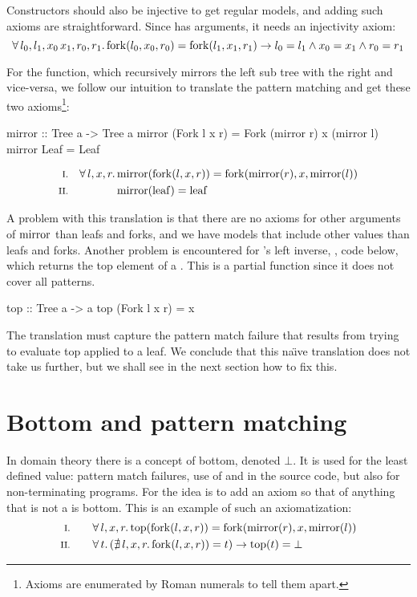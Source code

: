 Constructors should also be injective to get regular models, and
adding such axioms are straightforward. Since  has arguments,
it needs an injectivity axiom:
\begin{equation*}
\forall \, l_0 , l_1 , x_0 \, x_1 , r_0 , r_1 . \, \mathrm{fork}(l_0,x_0,r_0) =
\mathrm{fork}(l_1,x_1,r_1) \rightarrow l_0 = l_1 \wedge x_0 = x_1 \wedge r_0 = r_1
\end{equation*}

For the  function, which recursively mirrors the left sub
tree with the right and vice-versa, we follow our intuition to
translate the pattern matching and get these two axioms\footnote
{Axioms are enumerated by Roman numerals to tell them apart.}:

\begin{code}
mirror :: Tree a -> Tree a
mirror (Fork l x r) = Fork (mirror r) x (mirror l)
mirror Leaf         = Leaf
\end{code}
\begin{align*}
\rom{1} && \faaa{l}{x}{r} & \fn{mirror}(\fn{fork}(l,x,r)) \eq \fn{fork}(\fn{mirror}(r),x,\fn{mirror}(l)) \\
\rom{2} &&                & \fn{mirror}(\fn{leaf}) \eq \fn{leaf}
\end{align*}

\noindent
A problem with this translation is that there are no axioms for other
arguments of $\mathrm{mirror}$ than leafs and forks, and we have models that
include other values than leafs and forks. Another problem is
encountered for 's left inverse, , code below,
which returns the top element of a . This is a partial
function since it does not cover all patterns.

\begin{code}[label=lst:top]
top :: Tree a -> a
top (Fork l x r) = x
\end{code}

The translation must capture the pattern match failure that results
from trying to evaluate top applied to a leaf. We conclude that
this na\"{\i}ve translation does not take us further, but we shall see
in the next section how to fix this.

\section{Bottom and pattern matching}

In domain theory there is a concept of bottom, denoted $\bot$. It is
used for the least defined value: pattern match failures, use of
 and  in the source code, but also for
non-terminating programs.  
For  the idea is to add an axiom so that  of anything
that is not a  is bottom. This is an example of such an
axiomatization:
\begin{align*}
\rom{1} \qquad & \faaa{l}{x}{r} \fn{top}(\fn{fork}(l,x,r)) \eq \fn{fork}(\fn{mirror}(r),x,\fn{mirror}(l)) \\
\rom{2} \qquad & \fa{t}         (\nexxx{l}{x}{r} \fn{fork}(l,x,r)) \eq t) \rightarrow \fn{top}(t) \eq \bot
\end{align*}

